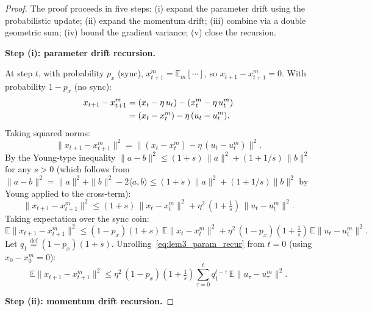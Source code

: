 \documentclass{article}
\begin{document}
\begin{proof}
The proof proceeds in five steps: (i) expand the parameter drift using the
probabilistic update; (ii) expand the momentum drift; (iii) combine via a
double geometric sum; (iv) bound the gradient variance; (v) close the
recursion.

\medskip
\noindent\textbf{Step (i): parameter drift recursion.}

At step $t$, with probability $p_x$ (sync), $x_{t+1}^m = \mathbb{E}_m[\cdots]$,
so $x_{t+1} - x_{t+1}^m = 0$. With probability $1 - p_x$ (no sync):
\begin{align}
x_{t+1} - x_{t+1}^m
&= (x_t - \eta\,u_t) - (x_t^m - \eta\,u_t^m) \notag \\
&= (x_t - x_t^m) - \eta\,(u_t - u_t^m).
\label{eq:lem3_param_nosync}
\end{align}
Taking squared norms:
\begin{equation}
\|x_{t+1} - x_{t+1}^m\|^2
= \|(x_t - x_t^m) - \eta\,(u_t - u_t^m)\|^2.
\label{eq:lem3_param_sq}
\end{equation}
By the Young-type inequality $\|a - b\|^2 \leq (1+s)\,\|a\|^2 +
(1 + 1/s)\,\|b\|^2$ for any $s > 0$ (which follows from
$\|a - b\|^2 = \|a\|^2 + \|b\|^2 - 2\langle a, b\rangle \leq
(1+s)\|a\|^2 + (1+1/s)\|b\|^2$ by Young applied to the cross-term):
\begin{equation}
\|x_{t+1} - x_{t+1}^m\|^2
\leq (1+s)\,\|x_t - x_t^m\|^2
+ \eta^2\,(1 + \tfrac{1}{s})\,\|u_t - u_t^m\|^2.
\label{eq:lem3_young}
\end{equation}
Taking expectation over the sync coin:
\begin{equation}
\mathbb{E}\|x_{t+1} - x_{t+1}^m\|^2
\leq (1-p_x)(1+s)\,\mathbb{E}\|x_t - x_t^m\|^2
+ \eta^2\,(1-p_x)(1+\tfrac{1}{s})\,\mathbb{E}\|u_t - u_t^m\|^2.
\label{eq:lem3_param_recur}
\end{equation}
Let $q_1 \stackrel{\text{def}}{=} (1-p_x)(1+s)$. Unrolling~\eqref{eq:lem3_param_recur}
from $t = 0$ (using $x_0 - x_0^m = 0$):
\begin{equation}
\mathbb{E}\|x_{t+1} - x_{t+1}^m\|^2
\leq \eta^2\,(1-p_x)(1+\tfrac{1}{s})
\sum_{\tau=0}^{t}q_1^{t-\tau}\,\mathbb{E}\|u_\tau - u_\tau^m\|^2.
\label{eq:lem3_param_unrolled}
\end{equation}

\medskip
\noindent\textbf{Step (ii): momentum drift recursion.}


\end{proof}
\end{document}
